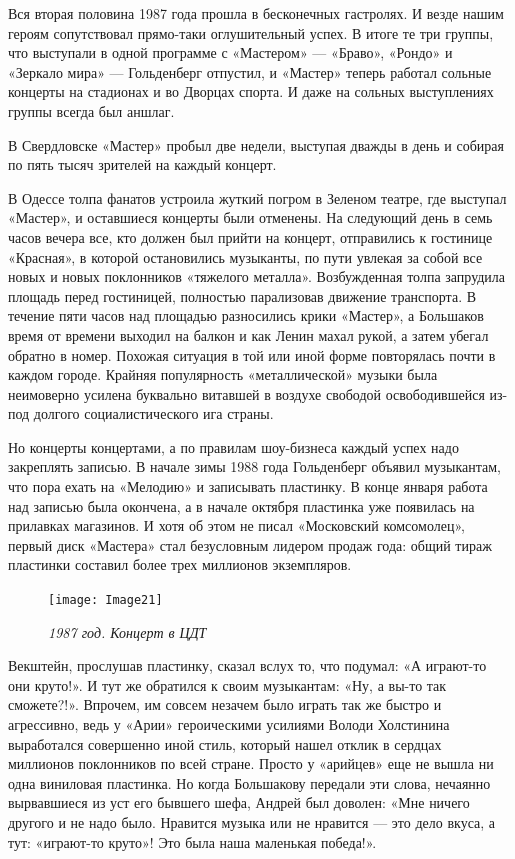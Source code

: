 \documentclass[16pt,a5paper,oneside]{book}
\begin{document}
Вся вторая половина 1987 года прошла в бесконечных гастролях. И везде нашим героям сопутствовал прямо-таки оглушительный
успех. В итоге те три группы, что выступали в одной программе с «Мастером» — «Браво», «Рондо» и «Зеркало мира» —
Гольденберг отпустил, и «Мастер» теперь работал сольные концерты на стадионах и во Дворцах спорта. И даже на сольных
выступлениях группы всегда был аншлаг.

В Свердловске «Мастер» пробыл две недели, выступая дважды в день и собирая по пять тысяч зрителей на каждый концерт.

В Одессе толпа фанатов устроила жуткий погром в Зеленом театре, где выступал «Мастер», и оставшиеся концерты были
отменены. На следующий день в семь часов вечера все, кто должен был прийти на концерт, отправились к гостинице
«Красная», в которой остановились музыканты, по пути увлекая за собой все новых и новых поклонников «тяжелого металла».
Возбужденная толпа запрудила площадь перед гостиницей, полностью парализовав движение транспорта. В течение пяти часов
над площадью разносились крики «Мастер», а Большаков время от времени выходил на балкон и как Ленин махал рукой, а затем
убегал обратно в номер. Похожая ситуация в той или иной форме повторялась почти в каждом городе. Крайняя популярность
«металлической» музыки была неимоверно усилена буквально витавшей в воздухе свободой освободившейся из-под долгого
социалистического ига страны.

Но концерты концертами, а по правилам шоу-бизнеса каждый успех надо закреплять записью. В начале зимы 1988 года
Гольденберг объявил музыкантам, что пора ехать на «Мелодию» и записывать пластинку. В конце января работа над записью
была окончена, а в начале октября пластинка уже появилась на прилавках магазинов. И хотя об этом не писал «Московский
комсомолец», первый диск «Мастера» стал безусловным лидером продаж года: общий тираж пластинки составил более трех
миллионов экземпляров.

\begin{figure}
    \centering
    \texttt{[image: Image21]}
    \caption{\textit{1987 год. Концерт в ЦДТ}}
\end{figure}

Векштейн, прослушав пластинку, сказал вслух то, что подумал: «А играют-то они круто!». И тут же обратился к своим
музыкантам: «Ну, а вы-то так сможете?!». Впрочем, им совсем незачем было играть так же быстро и агрессивно, ведь у
«Арии» героическими усилиями Володи Холстинина выработался совершенно иной стиль, который нашел отклик в сердцах
миллионов поклонников по всей стране. Просто у «арийцев» еще не вышла ни одна виниловая пластинка. Но когда Большакову
передали эти слова, нечаянно вырвавшиеся из уст его бывшего шефа, Андрей был доволен: «Мне ничего другого и не надо
было. Нравится музыка или не нравится — это дело вкуса, а тут: «играют-то круто»! Это была наша маленькая победа!».
\end{document}
